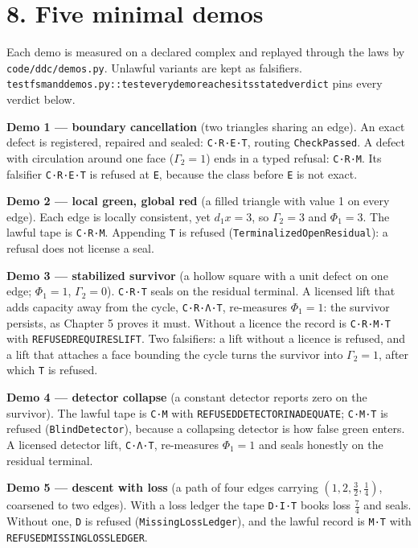 \documentclass[
  11pt,
]{article}
\renewcommand{\_}{\ddcunderscore\allowbreak}
\begin{document}
\section{8. Five minimal demos}\label{five-minimal-demos}

Each demo is measured on a declared complex and replayed through the
laws by \texttt{code/\allowbreak ddc/\allowbreak demos.\allowbreak py}. Unlawful variants are kept as
falsifiers.
\texttt{test\_fsm\_and\_demos.\allowbreak py::test\_every\_demo\_reaches\_its\_stated\_verdict}
pins every verdict below.

\textbf{Demo 1 --- boundary cancellation} (two triangles sharing an
edge). An exact defect is registered, repaired and sealed:
\texttt{C·R·E·T}, routing \texttt{Check\allowbreak Passed}. A defect with
circulation around one face (\(\Gamma_2 = 1\)) ends in a typed refusal:
\texttt{C·R·M}. Its falsifier \texttt{C·R·E·T} is refused at \texttt{E},
because the class before \texttt{E} is not exact.

\textbf{Demo 2 --- local green, global red} (a filled triangle with
value 1 on every edge). Each edge is locally consistent, yet
\(d_1 x = 3\), so \(\Gamma_2 = 3\) and \(\Phi_1 = 3\). The lawful tape
is \texttt{C·R·M}. Appending \texttt{T} is refused
(\texttt{Terminalized\allowbreak Open\allowbreak Residual}): a refusal does not license a seal.

\textbf{Demo 3 --- stabilized survivor} (a hollow square with a unit
defect on one edge; \(\Phi_1 = 1\), \(\Gamma_2 = 0\)). \texttt{C·R·T}
seals on the residual terminal. A licensed lift that adds capacity away
from the cycle, \texttt{C·R·Λ·T}, re-measures \(\Phi_1 = 1\): the
survivor persists, as Chapter 5 proves it must. Without a licence the
record is \texttt{C·R·M·T} with \texttt{REFUSED\_REQUIRES\_LIFT}. Two
falsifiers: a lift without a licence is refused, and a lift that
attaches a face bounding the cycle turns the survivor into
\(\Gamma_2 = 1\), after which \texttt{T} is refused.

\textbf{Demo 4 --- detector collapse} (a constant detector reports zero
on the survivor). The lawful tape is \texttt{C·M} with
\texttt{REFUSED\_DETECTOR\_INADEQUATE}; \texttt{C·M·T} is refused
(\texttt{Blind\allowbreak Detector}), because a collapsing detector is how false
green enters. A licensed detector lift, \texttt{C·Λ·T}, re-measures
\(\Phi_1 = 1\) and seals honestly on the residual terminal.

\textbf{Demo 5 --- descent with loss} (a path of four edges carrying
\((1, 2, \tfrac{3}{2}, \tfrac{1}{4})\), coarsened to two edges). With a
loss ledger the tape \texttt{D·I·T} books loss \(\tfrac{7}{4}\) and
seals. Without one, \texttt{D} is refused (\texttt{Missing\allowbreak Loss\allowbreak Ledger}),
and the lawful record is \texttt{M·T} with
\texttt{REFUSED\_MISSING\_LOSS\_LEDGER}.
\end{document}
